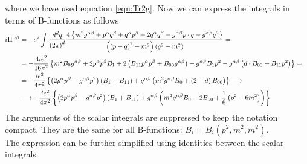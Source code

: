 where we have used equation \ref{eqn:Tr2g}. Now we can express the integrals in terms of B-functions as follows
\begin{align*}
i\Pi^{\alpha\beta} & = -e^2 \int \frac{d^dq}{\left( 2\pi \right)^d} \frac{4\left\lbrace m^2g^{\alpha\beta} + p^{\alpha}q^{\beta} + q^{\alpha}p^{\beta} + 2 q^{\alpha}q^{\beta} - g^{\alpha\beta} p \cdot q - g^{\alpha\beta} q^2 \right\rbrace}{\left( \left( p+q \right)^2 - m^2 \right) \left( q^2 - m^2 \right)} = & \\
& = -\frac{4ie^2}{16\pi^2} \left\lbrace m^2 B_0 g^{\alpha\beta} + 2 p^{\alpha}p^{\beta} B_1 + 2 \left( B_{11} p^{\alpha}p^{\beta} + B_{00} g^{\alpha\beta} \right) - g^{\alpha\beta} B_1 p^2 - g^{\alpha\beta} \left( d \cdot B_{00} + B_{11} p^2 \right) \right\rbrace = & \\
& = -\frac{ie^2}{4\pi^2} \left\lbrace \left( 2p^{\alpha}p^{\beta} - g^{\alpha\beta} p^2 \right) \left(B_1 + B_{11} \right) + g^{\alpha\beta} \left( m^2 g^{\alpha\beta} B_0 + \left( 2-d  \right) B_{00} \right) \right\rbrace \longrightarrow & \\
& \longrightarrow -\frac{ie^2}{4\pi^2} \left\lbrace \left( 2p^{\alpha}p^{\beta} - g^{\alpha\beta} p^2 \right) \left(B_1 + B_{11} \right) + g^{\alpha\beta} \left( m^2 g^{\alpha\beta} B_0 - 2 B_{00} + \frac{1}{6} \left( p^2 - 6m^2 \right) \right) \right\rbrace  &
\end{align*}
The arguments of the scalar integrals are suppressed to keep the notation compact. They are the same for all B-functions: $B_i = B_i (p^2,m^2,m^2)$. \\
The expression can be further simplified using identities between the scalar integrals.\\

